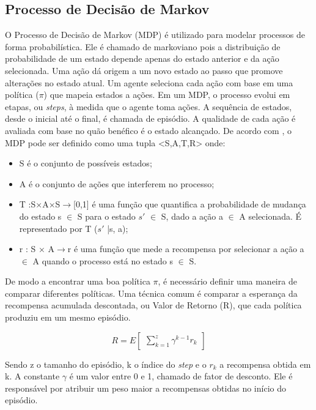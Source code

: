 \subsection{Processo de Decisão de Markov}
O Processo de Decisão de Markov (MDP) é utilizado para modelar processos de forma probabilística. Ele é chamado de markoviano pois a distribuição de probabilidade de um estado depende apenas do estado anterior e da ação selecionada. Uma ação dá origem a um novo estado ao passo que promove alterações no estado atual. 
Um agente seleciona cada ação com base em uma política ($\pi$) que mapeia estados a ações. Em um MDP, o processo evolui em etapas, ou \textit{steps}, à medida que o agente toma ações. A sequência de estados, desde o inicial até o final, é chamada de episódio. A qualidade de cada ação é avaliada com base no quão benéfico é o estado alcançado.
De acordo com \cite{MDP}, o MDP pode ser definido como uma tupla 
<S,A,T,R> onde:

\begin{itemize}
   \item S é o conjunto de possíveis estados;
   \item A é o conjunto de ações que interferem no processo;
   \item T :S×A×S$\rightarrow$[0,1] é uma função que quantifica a probabilidade de mudança do estado s $\in$ S para o estado $s'$ $\in$ S, dado a ação a $\in$ A selecionada. É representado por T ($s'$ |s, a);
   \item r : S × A$\rightarrow$r é uma função que mede a recompensa por selecionar a ação a $\in$ A quando o processo está no estado s $\in$ S.
 \end{itemize}

De modo a encontrar uma boa política $\pi$, é necessário definir uma maneira de comparar diferentes políticas. Uma técnica comum é comparar a esperança da recompensa acumulada descontada, ou Valor de Retorno (R), que cada política produziu em um mesmo episódio.

\begin{equation}
    R = E\begin{bmatrix} \sum_{k=1}^{z} \gamma ^{k-1} r_k \end{bmatrix}
\end{equation}

\noindent
Sendo z o tamanho do episódio, k o índice do \textit{step} e o $r_k$ a recompensa obtida em k. A constante $\gamma$ é um valor entre 0 e 1, chamado de fator de desconto. Ele é responsável por atribuir um peso maior a recompensas obtidas no início do episódio. 

